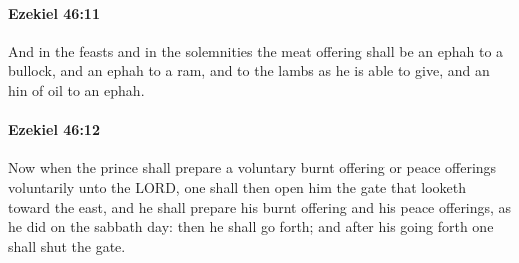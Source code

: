 		\paragraph{Ezekiel 46:11} %
			\label{EZEKIEL-46-11}

			And in the feasts and in the solemnities the meat offering shall be an ephah to a bullock, and an ephah to a ram, and to the lambs as he is able to give, and an hin of oil to an ephah.


		\paragraph{Ezekiel 46:12} %
			\label{EZEKIEL-46-12}

			Now when the prince shall prepare a voluntary burnt offering or peace offerings voluntarily unto the LORD, one shall then open him the gate that looketh toward the east, and he shall prepare his burnt offering and his peace offerings, as he did on the sabbath day: then he shall go forth; and after his going forth one shall shut the gate.


